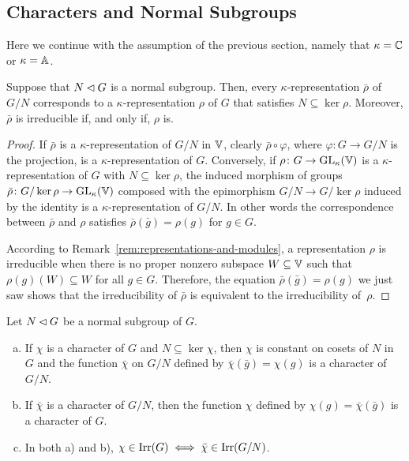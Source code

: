 \subsection{Characters and Normal Subgroups}

Here we continue with the assumption of the previous section, namely that $\kappa=\mathbb{C}$ or $\kappa=\mathbb{A}$.

\begin{prop}\label{prop:quotient-representations}
    Suppose that\/ $N\lhd G$ is a normal subgroup. Then, every\/ $\kappa$-representation\/ $\bar\rho$ of\/ $G/N$ corresponds to a\/ $\kappa$-representation\/ $\rho$ of\/ $G$ that satisfies\/ $N\subseteq\ker\rho$. Moreover, $\bar\rho$ is irreducible if, and only if, $\rho$ is.
\end{prop}

\begin{proof}
    If $\bar\rho$ is a $\kappa$-representation of $G/N$ in $\mathbb V$, clearly $\bar\rho\circ\varphi$, where $\varphi\colon G\to G/N$ is the projection, is a $\kappa$-representation of $G$. Conversely, if $\rho\colon G\to{\rm GL}_\kappa(\mathbb V)$ is a $\kappa$-representation of $G$ with $N\subseteq\ker\rho$, the induced morphism of groups $\bar\rho\colon G/\ker\rho\to{\rm GL}_\kappa(\mathbb V)$ composed with the epimorphism $G/N\to G/\ker\rho$ induced by the identity is a $\kappa$-representation of $G/N$. In other words the correspondence between $\bar\rho$ and $\rho$ satisfies $\bar\rho(\bar g)=\rho(g)$ for $g\in G$.

    According to Remark~\ref{rem:representations-and-modules}, a representation $\rho$ is irreducible when there is no proper nonzero subspace $W\subseteq\mathbb V$ such that $\rho(g)(W)\subseteq W$ for all $g\in G$. Therefore, the equation $\bar\rho(\bar g)=\rho(g)$ we just saw shows that the irreducibility of $\bar\rho$ is equivalent to the irreducibility of~$\rho$.
\end{proof}


\begin{cor}\label{cor:quotient-characters}
    Let\/ $N \lhd G$ be a normal subgroup of\/ $G$.
    \begin{enumerate}[a),font=\upshape]
        \item If\/ $\chi$ is a character of\/ $G$ and\/ $N \subseteq \ker \chi$, then\/ $\chi$ is constant on cosets of\/ $N$ in\/ $G$ and the function\/ $\bar\chi$ on\/ $G/N$ defined by\/ $\bar\chi(\bar g) = \chi(g)$ is a character of\/ $G/N$.
        
        \item If\/ $\bar\chi$ is a character of\/ $G/N$, then the function\/ $\chi$ defined by\/ $\chi(g) = \bar\chi(\bar g)$ is a character of\/ $G$.
        
        \item In both\/ {\rm a)} and\/ {\rm b)}, $\chi \in \operatorname{Irr}(G)\iff\bar\chi \in \operatorname{Irr}(G/N)$.
    \end{enumerate}
\end{cor}

